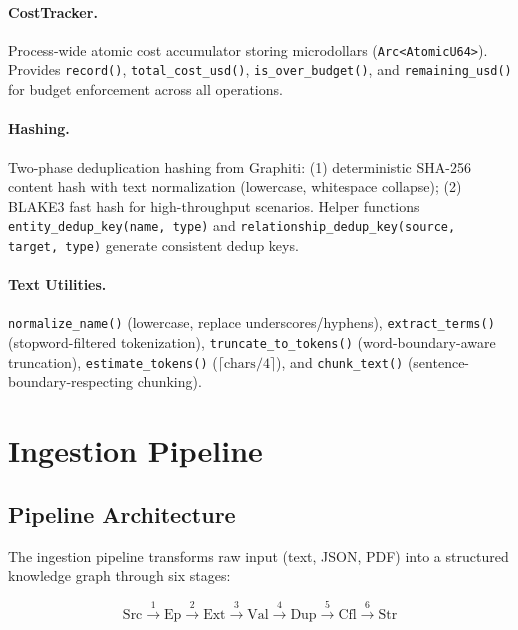 \documentclass[11pt,a4paper,twocolumn]{article}
\begin{document}
\paragraph{CostTracker.}
Process-wide atomic cost accumulator storing microdollars
(\texttt{Arc<AtomicU64>}). Provides \texttt{record()},
\texttt{total\_cost\_usd()}, \texttt{is\_over\_budget()}, and
\texttt{remaining\_usd()} for budget enforcement across
all operations.

\paragraph{Hashing.}
Two-phase deduplication hashing from Graphiti:
(1) deterministic SHA-256 content hash with text normalization
(lowercase, whitespace collapse); (2) BLAKE3 fast hash for
high-throughput scenarios. Helper functions
\texttt{entity\_dedup\_key(name, type)} and
\texttt{relationship\_dedup\_key(source, target, type)} generate
consistent dedup keys.

\paragraph{Text Utilities.}
\texttt{normalize\_name()} (lowercase, replace underscores/hyphens),
\texttt{extract\_terms()} (stopword-filtered tokenization),
\texttt{truncate\_to\_tokens()} (word-boundary-aware truncation),
\texttt{estimate\_tokens()} ($\lceil\text{chars}/4\rceil$),
and \texttt{chunk\_text()} (sentence-boundary-respecting chunking).

\section{Ingestion Pipeline}
\label{sec:ingestion}

\subsection{Pipeline Architecture}

The ingestion pipeline transforms raw input (text, JSON, PDF) into
a structured knowledge graph through six stages:

\begin{equation}
\text{Src} \xrightarrow{1} \text{Ep}
  \xrightarrow{2} \text{Ext}
  \xrightarrow{3} \text{Val}
  \xrightarrow{4} \text{Dup}
  \xrightarrow{5} \text{Cfl}
  \xrightarrow{6} \text{Str}
\end{equation}
\end{document}
